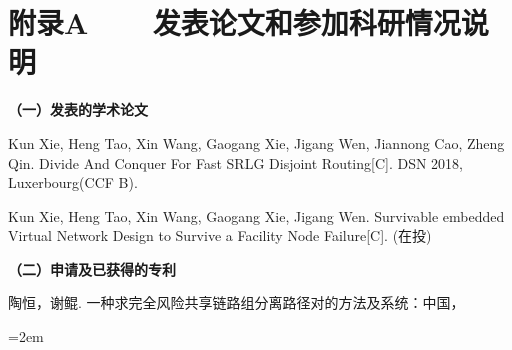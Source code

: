 
\chapter*{附录A~~~~发表论文和参加科研情况说明}
\setlength{\parindent}{0em}
\textbf{（一）发表的学术论文}
\begin{publist}
\item Kun Xie, Heng Tao, Xin Wang, Gaogang Xie, Jigang Wen, Jiannong Cao, Zheng Qin. Divide And Conquer For Fast SRLG Disjoint Routing[C]. DSN 2018, Luxerbourg(CCF B).
\item Kun Xie, Heng Tao, Xin Wang, Gaogang Xie, Jigang Wen. Survivable embedded Virtual Network Design to Survive a Facility Node Failure[C]. (在投)
\end{publist}

\vspace*{1em}
\textbf{（二）申请及已获得的专利}
\begin{publist}
\item 陶恒，谢鲲. 一种求完全风险共享链路组分离路径对的方法及系统：中国，%
\end{publist}
\vfill
{}\hangindent=2em\noindent

\setlength{\parindent}{2em}
